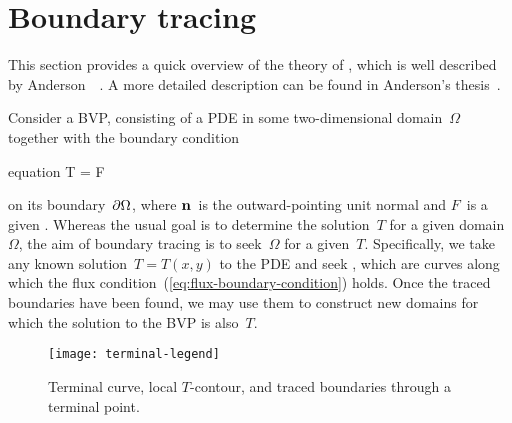 \section{Boundary tracing}
\label{sec:introduction.tracing}

This section provides a quick overview of
the theory of ,
which is well described by
Anderson~\etal~\cite{anderson-2007-boundary-tracing-i-theory}.
A more detailed description can be found in
Anderson's thesis~\cite{anderson-2002-thesis-boundary-tracing-pdes}.

Consider a BVP\@, consisting of
a PDE in some two-dimensional domain~$\Omega$
together with the boundary condition
\begin{important}{equation}
  \normalvec \dotp \del T = F 
  \label{eq:flux-boundary-condition}
\end{important}
on its boundary~$\mathop{}\!\partial\Omega$,
where $\mathop{}\!\boldsymbol{\mathbf{n}}$~is the outward-pointing unit normal
and $F$~is a given .
Whereas the usual goal is
to determine the solution~$T$ for a given domain~$\Omega$,
the aim of boundary tracing is
to seek~$\Omega$ for a given~$T$.
Specifically, we take any known solution~$T = T (x, y)$ to the PDE
and seek , which are curves
along which the flux condition~(\ref{eq:flux-boundary-condition}) holds.
Once the traced boundaries have been found,
we may use them to construct new domains
for which the solution to the BVP is also~$T$.

\begin{figure}
  \newcommand*{\subfigurewidth}{0.325\textwidth}
  \centering
  \texttt{[image: terminal-legend]}
  \begin{subfigure}{\subfigurewidth}
  \end{subfigure}
  \hfill
  \begin{subfigure}{\subfigurewidth}
  \end{subfigure}
  \hfill
  \begin{subfigure}{\subfigurewidth}
  \end{subfigure}
  \caption{
    Terminal curve, local $T$-contour, and traced boundaries
    through a terminal point.
  }
  \label{fig:terminal}
\end{figure}

